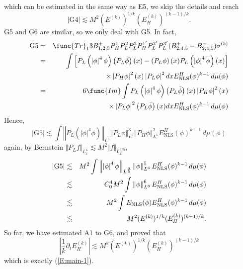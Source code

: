 \documentclass[12pt,letterpaper,leqno]{amsart}
\theoremstyle{plain}
\numberwithin{equation}{section}
\numberwithin{theorem}{section}
\numberwithin{proposition}{section}
\numberwithin{lemma}{section}
\numberwithin{corollary}{section}
\begin{document}
which can be estimated in the same way as E5, we skip the details and reach%
\begin{equation*}
\left\vert \text{G4}\right\vert \lesssim
M^{2}(E^{(k)})^{1/k}(E_{H}^{(k)})^{(k-1)/k}.
\end{equation*}%
G5 and G6 are similar, so we only deal with G5. In fact,%
\begin{eqnarray*}
\text{G5} &=&\func{Tr}%
_{1}3B_{1;2,3}^{+}P_{H}^{1}P_{L}^{2}P_{L}^{3}P_{H}^{1^{\prime
}}P_{L}^{2^{\prime }}P_{L}^{3^{\prime }}(B_{2;4,5}^{+}-B_{2;4,5}^{-})\sigma
^{(5)} \\
&=&\int \left[ P_{L}\left( \left\vert \phi \right\vert ^{4}\phi \right)
\left( P_{L}\bar{\phi}\right) (x)-\left( P_{L}\phi \right) (x)P_{L}\left(
\left\vert \phi \right\vert ^{4}\bar{\phi}\right) (x)\right] \\
&&\times \left\vert P_{H}\phi \right\vert ^{2}(x)\left\vert P_{L}\phi
\right\vert ^{2}dxE_{\text{NLS}}^{H}(\phi )^{k-1}\,d\mu (\phi ) \\
&=&6\func{Im}\int P_{L}\left( \left\vert \phi \right\vert ^{4}\phi \right)
\left( P_{L}\bar{\phi}\right) (x)\left\vert P_{H}\phi \right\vert ^{2}(x) \\
&&\times \left\vert P_{L}\phi \right\vert ^{2}\left( P_{L}\bar{\phi}\right)
(x)dxE_{\text{NLS}}^{H}(\phi )^{k-1}\,d\mu (\phi )
\end{eqnarray*}%
Hence,%
\begin{equation*}
\left\vert \text{G5}\right\vert \lesssim \int \left\Vert P_{L}\left(
\left\vert \phi \right\vert ^{4}\phi \right) \right\Vert _{L^{6}}\left\Vert
P_{L}\phi \right\Vert _{L^{6}}^{3}\left\Vert P_{H}\phi \right\Vert
_{L^{6}}^{2}E_{\text{NLS}}^{H}(\phi )^{k-1}\,d\mu (\phi )
\end{equation*}%
again, by Bernstein $\Vert P_{L}f\Vert _{L_{x}^{6}}\lesssim M^{2}\Vert
f\Vert _{L_{x}^{6/5}}$,%
\begin{eqnarray*}
\left\vert \text{G5}\right\vert &\lesssim &M^{2}\int \left\Vert \left\vert
\phi \right\vert ^{4}\phi \right\Vert _{L^{\frac{6}{5}}}\left\Vert \phi
\right\Vert _{L^{6}}^{5}E_{\text{NLS}}^{H}(\phi )^{k-1}\,d\mu (\phi ) \\
&\lesssim &C_{0}^{4}M^{2}\int \left\Vert \phi \right\Vert _{L^{6}}^{6}E_{%
\text{NLS}}^{H}(\phi )^{k-1}\,d\mu (\phi ) \\
&\lesssim &M^{2}\int E_{\text{NLS}}(\phi )E_{\text{NLS}}^{H}(\phi
)^{k-1}\,d\mu (\phi ) \\
&\lesssim &M^{2}(E^{(k)})^{1/k}(E_{H}^{(k)})^{(k-1)/k}.
\end{eqnarray*}%
So far, we have estimated A1 to G6, and proved that 
\begin{equation*}
\left\vert \frac{1}{k}\partial _{t}E_{H}^{(k)}\right\vert \lesssim
M^{2}(E^{(k)})^{1/k}(E_{H}^{(k)})^{(k-1)/k}
\end{equation*}%
which is exactly (\ref{E:main-1}).
\end{document}
